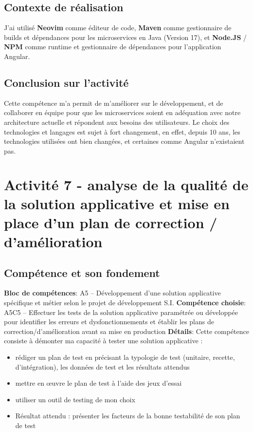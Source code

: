 \documentclass[a4paper, 11pt]{report}
\begin{document}
\subsection{Contexte de réalisation}
J'ai utilisé \textbf{Neovim} comme éditeur de code, \textbf{Maven} comme gestionnaire de builds et dépendances pour les microservices en Java (Version 17), et \textbf{Node.JS} / \textbf{NPM} comme runtime et gestionnaire de dépendances pour l'application Angular.
\subsection{Conclusion sur l'activité}
Cette compétence m'a permit de m'améliorer sur le développement, et de collaborer en équipe pour que les microservices soient en adéquation avec notre architecture actuelle et répondent aux besoins des utilisateurs.
\newline
\newline
Le choix des technologies et langages est sujet à fort changement, en effet, depuis 10 ans, les technologies utilisées ont bien changées, et certaines comme Angular n'existaient pas.

\section{Activité 7 - analyse de la qualité de la solution applicative et mise en place d’un plan de correction / d’amélioration}
\subsection{Compétence et son fondement}
\textbf{Bloc de compétences}: A5 – Développement d’une solution applicative spécifique et métier selon le projet de développement S.I.
\newline
\textbf{Compétence choisie}: A5C5 – Effectuer les tests de la solution applicative paramétrée ou développée pour identifier les erreurs et dysfonctionnements et établir les plans de correction/d’amélioration avant sa mise en production
\newline
\textbf{Détails}: Cette compétence consiste à démonter ma capacité à tester une solution applicative :
\begin{itemize}
  \item rédiger un plan de test en précisant la typologie de test (unitaire, recette, d’intégration), les données de test et les résultats attendus
  \item mettre en œuvre le plan de test à l’aide des jeux d’essai
  \item utiliser un outil de testing de mon choix
  \item Résultat attendu : présenter les facteurs de la bonne testabilité de son plan de test
\end{itemize}
\end{document}
